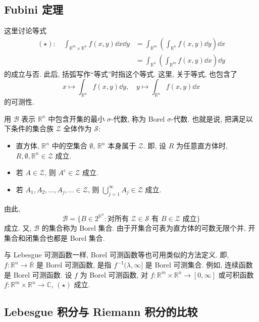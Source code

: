 \subsection*{Fubini 定理}

这里讨论等式
\begin{align*}
(\star): \quad \int_{\mathbb{R}^{m} \times \mathbb{R}^{n}}f(x, y)\dd x\dd y &= \int_{\mathbb{R}^{m}}\left(\int_{\mathbb{R}^{n}}f(x, y)\dd y\right)\dd x \\
&= \int_{\mathbb{R}^{n}}\left(\int_{\mathbb{R}^{m}}f(x, y)\dd x\right)\dd y
\end{align*}
的成立与否. 此后, 括弧写作``等式''时指这个等式. 这里, 关于等式, 也包含了
\[
x \mapsto \int_{\mathbb{R}^{n}}f(x, y)\dd y, \quad y \mapsto \int_{\mathbb{R}^{n}}f(x, y)\dd x
\]
的可测性.

用 $\mathcal{B}$ 表示 $\mathbb{R}^{n}$ 中包含开集的最小 $\sigma$-代数, 称为 Borel $\sigma$-代数. 也就是说, 把满足以下条件的集合族 $\mathcal{Z}$ 全体作为 $\mathcal{S}$:

\begin{itemize}
\item 直方体, $\mathbb{R}^{n}$ 中的空集合 $\emptyset$, $\mathbb{R}^{n}$ 本身属于 $\mathcal{Z}$. 即, 设 $R$ 为任意直方体时, $R, \emptyset, \mathbb{R}^{n} \in \mathcal{Z}$ 成立.

\item 若 $A \in \mathcal{Z}$, 则 $A^{\mathrm{c}} \in \mathcal{Z}$ 成立.

\item 若 $A_{1}, A_{2}, \ldots, A_{j}, \ldots \in \mathcal{Z}$, 则 $\bigcup_{j=1}^{\infty}A_{j} \in \mathcal{Z}$ 成立.
\end{itemize}

由此,
\[
\mathcal{B} = \{B \in 2^{\mathbb{R}^{n}} : \text{对所有 } \mathcal{Z} \in \mathcal{S} \text{ 有 } B \in \mathcal{Z} \text{ 成立}\}
\]
成立. 又, $\mathcal{B}$ 的集合称为 Borel 集合. 由于开集合可表为直方体的可数无限个并, 开集合和闭集合也都是 Borel 集合.

与 Lebesgue 可测函数一样, Borel 可测函数等也可用类似的方法定义. 即, $f: \mathbb{R}^{n} \to \overline{\mathbb{R}}$ 是 Borel 可测函数, 是指 $f^{-1}(\lambda, \infty]$ 是 Borel 可测集合. 例如, 连续函数是 Borel 可测函数. 设 $f$ 为 Borel 可测函数, 对 $f: \mathbb{R}^{m} \times \mathbb{R}^{n} \to [0, \infty]$ 或可积函数 $f: \mathbb{R}^{m} \times \mathbb{R}^{n} \to \mathbb{C}$, $(\star)$ 成立.

\subsection*{Lebesgue 积分与 Riemann 积分的比较}


